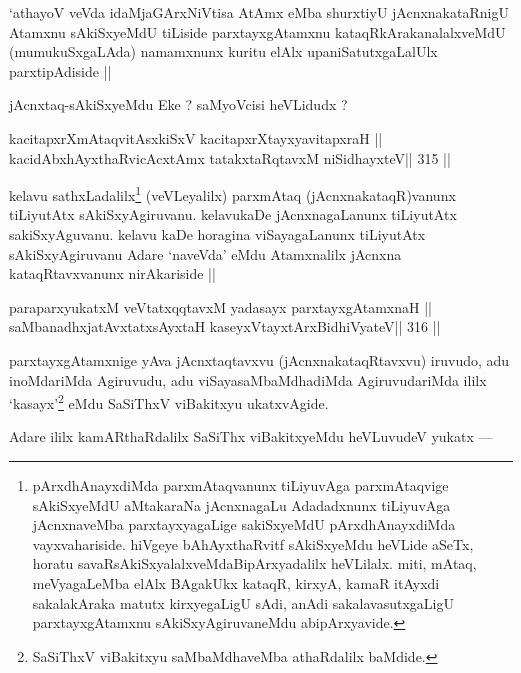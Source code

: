 \begin{artha}
`athayoV veVda idaMjaGArxNiVtisa AtAmx eMba shurxtiyU jAcnxnakataRnigU Atamxnu sAkiSxyeMdU tiLiside parxtayxgAtamxnu kataqRkArakanalalxveMdU (mumukuSxgaLAda) namamxnunx kuritu elAlx upaniSatutxgaLalUlx parxtipAdiside ||
\end{artha}

\begin{artha}
jAcnxtaq-sAkiSxyeMdu Eke ? saMyoVcisi heVLidudx ?
\end{artha}

\begin{shl}
kacitapxrXmAtaqvitAsxkiSxV kacitapxrXtayxyavitapxraH ||
kacidAbxhAyxthaRvicAcx\s\s tAmx tatakxtaRqtavxM niSidhayxteV\hfill || 315 ||
\end{shl}

\begin{artha}
kelavu sathxLadalilx\footnote[2]{pArxdhAnayxdiMda parxmAtaqvanunx tiLiyuvAga parxmAtaqvige sAkiSxyeMdU aMtakaraNa jAcnxnagaLu Adadadxnunx tiLiyuvAga jAcnxnaveMba parxtayxyagaLige sakiSxyeMdU pArxdhAnayxdiMda vayxvahariside. hiVgeye bAhAyxthaRvitf sAkiSxyeMdu heVLide aSeTx, horatu savaRsAkiSxyalalxveMdaBipArxyadalilx heVLilalx. miti, mAtaq, meVyagaLeMba elAlx BAgakUkx kataqR, kirxyA, kamaR itAyxdi sakalakAraka matutx kirxyegaLigU sAdi, anAdi sakalavasutxgaLigU parxtayxgAtamxnu sAkiSxyAgiruvaneMdu abipArxyavide.} (veVLeyalilx) parxmAtaq (jAcnxnakataqR)vanunx tiLiyutAtx sAkiSxyAgiruvanu. kelavukaDe jAcnxnagaLanunx tiLiyutAtx sakiSxyAguvanu. kelavu kaDe horagina viSayagaLanunx tiLiyutAtx sAkiSxyAgiruvanu Adare `naveVda' eMdu Atamxnalilx jAcnxna kataqRtavxvanunx nirAkariside ||
\end{artha}

\begin{shl}
paraparxyukatxM veVtatxqqtavxM yadasayx parxtayxgAtamxnaH ||
saMbanadhxjatAvxtatxsAyxtaH kaseyxVtayxtArxBidhiVyateV\hfill || 316 ||
\end{shl}

\begin{artha}
parxtayxgAtamxnige yAva jAcnxtaqtavxvu (jAcnxnakataqRtavxvu) iruvudo, adu inoMdariMda Agiruvudu, adu viSayasaMbaMdhadiMda AgiruvudariMda ililx `kasayx'\footnote[3]{SaSiThxV viBakitxyu saMbaMdhaveMba athaRdalilx baMdide.} eMdu SaSiThxV viBakitxyu ukatxvAgide.
\end{artha}

\begin{artha}
Adare ililx kamARthaRdalilx SaSiThx viBakitxyeMdu heVLuvudeV yukatx ---
\end{artha}

